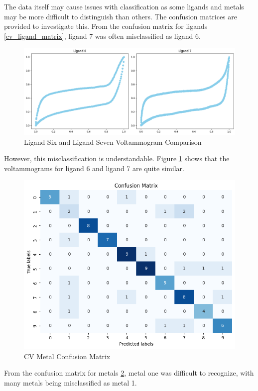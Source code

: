 The data itself may cause issues with classification as some ligands and metals may be more difficult to distinguish than others. The confusion matrices are provided to investigate this.
From the confusion matrix for ligands \ref{cv_ligand_matrix}, ligand 7 was often misclassified as ligand 6.
\begin{figure}[h!]
  \centering
    \includegraphics[width=1.0\textwidth]{figures/ligand_comparison.png}
    \caption{Ligand Six and Ligand Seven Voltammogram Comparison}
    \label{ligand_comparison}
\end{figure}
However, this misclassification is understandable. Figure \ref{ligand_comparison} shows that the voltammograms for ligand 6 and ligand 7 are quite similar. 
\begin{figure}[h!]
  \centering
    \includegraphics[width=1.0\textwidth]{figures/cv_metal_matrix.png}
    \caption{CV Metal Confusion Matrix}
    \label{cv_metal_matrix}
\end{figure}
From the confusion matrix for metals \ref{cv_metal_matrix}, metal one was difficult to recognize, with many metals being misclassified as metal 1. 
